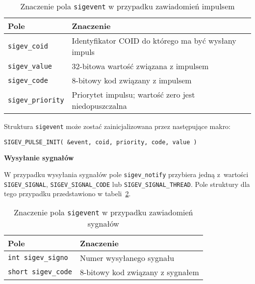 \begin{table}[h!]
\centering
\caption{Znaczenie pola  \lstinline[style=MyCStyle]{sigevent} w przypadku zawiadomień impulsem}
\setlength{\arrayrulewidth}{1pt}
\setlength{\tabcolsep}{6pt}
\renewcommand{\arraystretch}{1.2}
\begin{tabular}{ |p{}|p{}|}
\hline \rowcolor{gray}
\textbf{Pole} & \textbf{Znaczenie} \\ \hline
\mbox{\lstinline[style=MyCStyle]{sigev_coid}} & Identyfikator COID do którego ma być wysłany impuls \\ \hline
\mbox{\lstinline[style=MyCStyle]{sigev_value}} & 32-bitowa wartość związana z impulsem \\ \hline
\mbox{\lstinline[style=MyCStyle]{sigev_code}} & 8-bitowy kod związany z impulsem \\ \hline
\mbox{\lstinline[style=MyCStyle]{sigev_priority}} & Priorytet impulsu; wartość zero jest niedopuszczalna \\ \hline
\end{tabular}
\label{tab:sigevent2}
\end{table}

Struktura \lstinline[style=MyCStyle]{sigevent} może zostać zainicjalizowana przez następujące makro:

\begin{lstlisting}[style=MyCStyle]
SIGEV_PULSE_INIT( &event, coid, priority, code, value )
\end{lstlisting}


\noindent
\textbf{Wysyłanie sygnałów}

W przypadku wysyłania sygnałów pole \lstinline[style=MyCStyle]{sigev_notify} przybiera jedną z~wartości \lstinline[style=MyCStyle]{SIGEV_SIGNAL}, \lstinline[style=MyCStyle]{SIGEV_SIGNAL_CODE} lub \lstinline[style=MyCStyle]{SIGEV_SIGNAL_THREAD}. Pole struktury dla tego przypadku przedstawiono w tabeli~\ref{tab:sigevent3}.


\begin{table}[h!]
\centering
\caption{Znaczenie pola  \lstinline[style=MyCStyle]{sigevent} w przypadku zawiadomień sygnałów}
\setlength{\arrayrulewidth}{1pt}
\setlength{\tabcolsep}{6pt}
\renewcommand{\arraystretch}{1.2}
\begin{tabular}{ |p{}|p{}|}
\hline \rowcolor{gray}
\textbf{Pole} & \textbf{Znaczenie} \\ \hline
\mbox{\lstinline[style=MyCStyle]{int sigev_signo}} & Numer wysyłanego sygnału \\ \hline
\mbox{\lstinline[style=MyCStyle]{short sigev_code}} & 8-bitowy kod związany z sygnałem \\ \hline
\end{tabular}
\label{tab:sigevent3}
\end{table}

